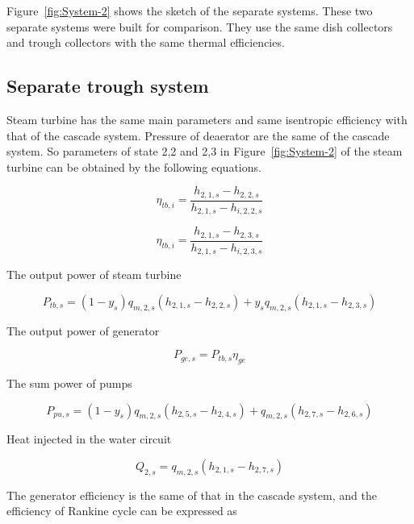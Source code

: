 \documentclass{article}
\begin{document}
Figure~\ref{fig:System-2} shows the sketch of the separate systems. These two separate systems were built for comparison. They use the same dish collectors and trough collectors with the same thermal efficiencies.

\subsection{Separate trough system}

Steam turbine has the same main parameters and same isentropic efficiency with that of the cascade system. Pressure of deaerator are the same of the cascade system. So parameters of state 2,2 and 2,3 in Figure~\ref{fig:System-2} of the steam turbine can be obtained by the following equations.

\begin{equation*}
	\eta_{tb,i}=\frac{h_{2,1,s}-h_{2,2,s}}{h_{2,1,s}-h_{i,2,2,s}}
\end{equation*}

\begin{equation*}
	\eta_{tb,i}=\frac{h_{2,1,s}-h_{2,3,s}}{h_{2,1,s}-h_{i,2,3,s}}
\end{equation*}

The output power of steam turbine

\begin{equation*}
	P_{tb,s}=\left(1-y_{s}\right)q_{m,2,s}\left(h_{2,1,s}-h_{2,2,s}\right)+y_{s}q_{m,2,s}\left(h_{2,1,s}-h_{2,3,s}\right)
\end{equation*}

The output power of generator

\begin{equation*}
	P_{ge,s}=P_{tb,s}\eta_{ge}
\end{equation*}

The sum power of pumps

\begin{equation*}
	P_{pu,s}=\left(1-y_{s}\right)q_{m,2,s}\left(h_{2,5,s}-h_{2,4,s}\right)+q_{m,2,s}\left(h_{2,7,s}-h_{2,6,s}\right)
\end{equation*}

Heat injected in the water circuit

\begin{equation*}
	Q_{2,s}=q_{m,2,s}\left(h_{2,1,s}-h_{2,7,s}\right)
\end{equation*}

The generator efficiency is the same of that in the cascade system, and the efficiency of Rankine cycle can be expressed as
\end{document}

